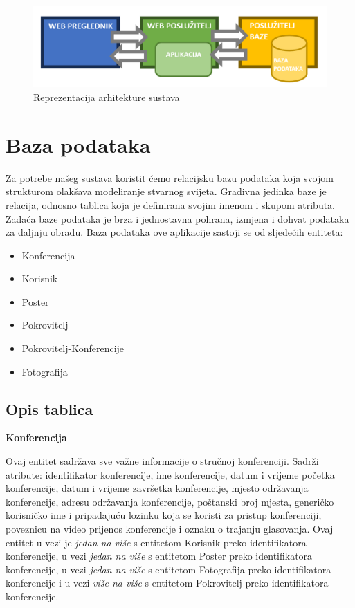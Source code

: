 \begin{figure} [hbt!]
	\includegraphics[width=\linewidth]{Slike/ArhitekturaSustava}
	\caption{Reprezentacija arhitekture sustava}
\end{figure}

		\clearpage

		\section{Baza podataka}
			
		Za potrebe našeg sustava koristit ćemo relacijsku bazu podataka koja svojom strukturom olakšava modeliranje stvarnog svijeta. Gradivna jedinka baze je relacija, odnosno tablica koja je definirana svojim imenom i skupom atributa. Zadaća baze podataka je brza i jednostavna pohrana, izmjena i dohvat podataka za daljnju obradu.
		Baza podataka ove aplikacije sastoji se od sljedećih entiteta: 
		
		\begin{itemize}
			\item Konferencija
			\item Korisnik
			\item Poster
			\item Pokrovitelj
			\item Pokrovitelj-Konferencije
			\item Fotografija
		\end{itemize}
		
		\clearpage
		
		\subsection{Opis tablica}
	
	\noindent\textbf{Konferencija }
	
	Ovaj entitet sadržava sve važne informacije o stručnoj konferenciji. Sadrži atribute: identifikator konferencije, ime konferencije, datum i vrijeme početka konferencije, datum i vrijeme završetka konferencije, mjesto održavanja konferencije, adresu održavanja konferencije, poštanski broj mjesta, generičko korisničko ime i pripadajuću lozinku koja se koristi za pristup konferenciji, poveznicu na video prijenos konferencije i oznaku o trajanju glasovanja. Ovaj entitet u vezi je \textit{jedan na više} s entitetom Korisnik preko identifikatora konferencije, u vezi \textit{jedan na više} s entitetom Poster preko identifikatora konferencije, u vezi \textit{jedan na više} s entitetom Fotografija preko identifikatora konferencije i u vezi \textit{više na više} s entitetom Pokrovitelj preko identifikatora konferencije. 
	
